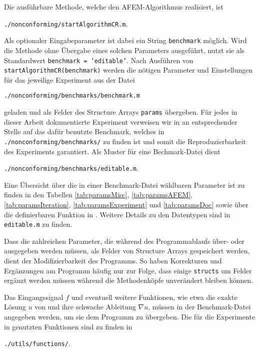 Die ausführbare Methode, welche den AFEM-Algorithmus realisiert, ist
\begin{center}
  \texttt{./nonconforming/startAlgorithmCR.m}.
\end{center}
Als optionaler Eingabeparameter ist dabei ein String \texttt{benchmark}
möglich. 
Wird die Methode ohne Übergabe eines solchen Parameters ausgeführt, nutzt
sie als Standardwert \texttt{benchmark = 'editable'}.
Nach Ausführen von \texttt{startAlgorithmCR(benchmark)} werden die nötigen
Parameter und Einstellungen für das jeweilige Experiment aus der Datei
\begin{center}
  \texttt{./nonconforming/benchmarks/benchmark.m}
\end{center}
geladen und als Felder des Structure Arrays \texttt{params} übergeben. Für
jedes in dieser Arbeit dokumentierte Experiment verweisen wir in
 an entsprechender Stelle auf das dafür benutzte 
Benchmark, welches in \texttt{./nonconforming/benchmarks/} zu finden ist und
somit die Reproduzierbarkeit des Experiments garantiert. 
Als Muster für eine Bechmark-Datei dient
\begin{center}
  \texttt{./nonconforming/benchmarks/editable.m}.
\end{center}
Eine Übersicht über die in einer Benchmark-Datei wählbaren Parameter ist
zu finden in den Tabellen \ref{tab:paramsMisc}, \ref{tab:paramsAFEM}, 
\ref{tab:paramsIteration}, \ref{tab:paramsExperiment} und \ref{tab:paramsDoc}
sowie über die definierbaren Funktion in .
Weitere Details zu den Datentypen sind in \texttt{editable.m} zu finden.

Dass die zahlreichen Parameter, die während des Pro\-gramm\-ab\-laufs
über- oder ausgegeben werden müssen, als Felder von
Struc\-ture Ar\-rays gespeichert werden, dient der Modifizierbarkeit des
Programms. 
So haben Korrekturen und Ergänzungen am Programm häufig nur zur Folge, dass
einige \texttt{structs} um Felder ergänzt werden müssen während die 
Methodenköpfe unverändert bleiben können.

Das Eingangssignal $f$ und eventuell weitere Funktionen, wie etwa die exakte
Lösung $u$ von  und ihre schwache Ableitung
$\nabla u$, müssen in der Benchmark-Datei angegeben werden, um sie dem
Programm zu übergeben. 
Die für die Experimente in  genutzten Funktionen sind zu
finden in 
\begin{center}
  \texttt{./utils/functions/}.
\end{center}


